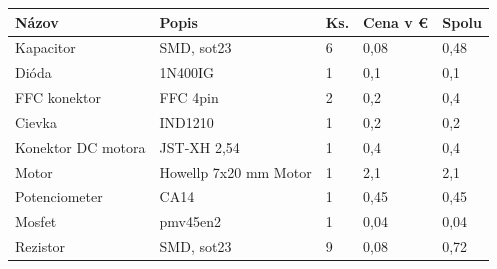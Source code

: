 \begin{table}
	\begin{tabular}{p{} p{} p{} p{} p{}}
		\hline
		\multicolumn{1}{|l}{\textbf{Názov}} & \textbf{Popis}                                     & \multicolumn{1}{l}{\textbf{Ks.}} & \multicolumn{1}{l}{\textbf{Cena v \euro}} & \multicolumn{1}{l|}{\textbf{Spolu}} \\ \hline
		Kapacitor                           & SMD, sot23                                         & 6                                  & 0,08                                      & 0,48                                        \\
		Dióda                               & 1N400IG                                            & 1                                  & 0,1                                      & 0,1                                        \\
		FFC konektor                        & FFC 4pin                                           & 2                                  & 0,2                                      & 0,4                                        \\
		Cievka                              & IND1210                                            & 1                                  & 0,2                                      & 0,2                                        \\
		Konektor DC motora                  & JST-XH 2,54                                        & 1                                  & 0,4                                      & 0,4                                        \\
		Motor                               & Howellp 7x20 mm Motor                               & 1                                  & 2,1                                      & 2,1                                        \\
		Potenciometer                       & CA14                                               & 1                                  & 0,45                                     & 0,45                                       \\
		Mosfet                              & pmv45en2                                           & 1                                  & 0,04                                     & 0,04                                       \\
		Rezistor                            & SMD, sot23                                         & 9                                  & 0,08                                      & 0,72                                        \\

\end{tabular}
\end{table}
